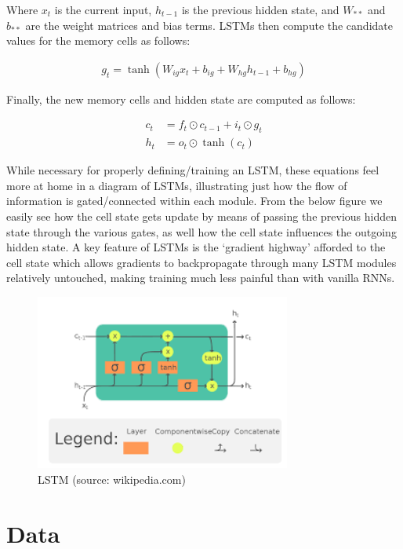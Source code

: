 \documentclass[12pt, twoside]{report}
\begin{document}
Where $x_t$ is the current input, $h_{t-1}$ is the previous hidden state, and $W_{**}$ and $b_{**}$ 
are the weight matrices and bias terms.
LSTMs then compute the candidate values for the memory cells as follows:

\begin{align}
    g_t = \tanh(W_{ig} x_t + b_{ig} + W_{hg} h_{t-1} + b_{hg})
\end{align}

Finally, the new memory cells and hidden state are computed as follows:

\begin{align}
    c_t &= f_t \odot c_{t-1} + i_t \odot g_t \\
    h_t &= o_t \odot \tanh(c_t)
\end{align}

While necessary for properly defining/training an LSTM, these equations feel more at home in a diagram of LSTMs,
illustrating just how the flow of information is gated/connected within each module.
From the below figure we easily see how the cell state gets update by means of passing the
previous hidden state through the various gates, as well how the cell state influences the outgoing
hidden state. A key feature of LSTMs is the `gradient highway' afforded to the cell state which allows
gradients to backpropagate through many LSTM modules relatively untouched, making training much less painful
than with vanilla RNNs.

\begin{figure}[H]
    \centering
    \includegraphics[width=0.75\textwidth]{figures/lstm fig.png}
    \caption*{LSTM (source: wikipedia.com)}
\end{figure}

\section{Data}
\end{document}
